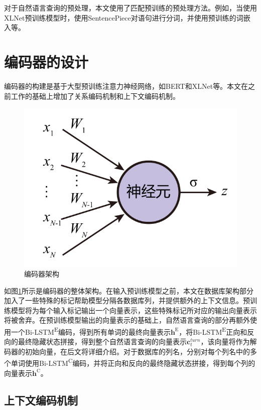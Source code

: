 对于自然语言查询的预处理，本文使用了匹配预训练的预处理方法。例如，当使用XLNet\cite{XLNet19}预训练模型时，使用SentencePiece对语句进行分词，并使用预训练的词嵌入等。

\section{编码器的设计}

编码器的构建是基于大型预训练注意力神经网络，如BERT\cite{bert19}和XLNet\cite{XLNet19}等。本文在之前工作的基础上增加了关系编码机制和上下文编码机制。

\begin{figure}
    \centering
    \includegraphics[page=7,width=\linewidth]{figure/figures.pdf}
    \caption{编码器架构}
    \label{enc-arch}
\end{figure}

如图\ref{enc-arch}所示是编码器的整体架构。在输入预训练模型之前，本文在数据库架构部分加入了一些特殊的标记帮助模型分隔各数据库列，并提供额外的上下文信息。预训练模型将为每个输入标记输出一个向量表示，这些特殊标记所对应的输出向量表示将被舍弃。在预训练模型输出的向量表示的基础上，自然语言查询的部分再额外使用一个Bi-LSTM\textsuperscript{E}编码，得到所有单词的最终向量表示$\bm{h}^\mathrm{E}$，将Bi-LSTM\textsuperscript{E}正向和反向的最终隐藏状态拼接，得到整个自然语言查询的向量表示$\bm{c}_t^{turn}$，该向量将作为解码器的初始向量，在后文将详细介绍。对于数据库的列名，分别对每个列名中的多个单词使用Bi-LSTM\textsuperscript{C}编码，并将正向和反向的最终隐藏状态拼接，得到每个列的向量表示$\bm{h}^\mathrm{C}$。

\subsection{上下文编码机制}

